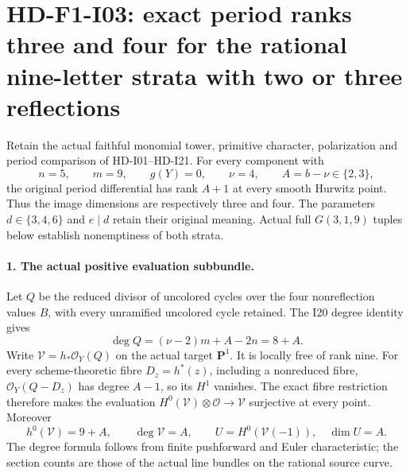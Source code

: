 \section[HD-F1-I03: nine letters and two or three reflections]{HD-F1-I03: exact period ranks three and four for the rational nine-letter strata with two or three reflections}
\label{sec:f1-nine-letter-two-three-reflection-rank}

Retain the actual faithful monomial tower, primitive character,
polarization and period comparison of HD-I01--HD-I21.
For every component with
\[
 n=5,\qquad m=9,\qquad g(Y)=0,\qquad \nu=4,
 \qquad A=b-\nu\in\{2,3\},
\]
the original period differential has rank $A+1$ at every smooth
Hurwitz point. Thus the image dimensions are respectively three
and four. The parameters $d\in\{3,4,6\}$ and $e\mid d$ retain
their original meaning. Actual full $G(3,1,9)$ tuples below
establish nonemptiness of both strata.

\paragraph{1. The actual positive evaluation subbundle.}
Let $Q$ be the reduced divisor of uncolored cycles over the
four nonreflection values $B$, with every unramified uncolored
cycle retained. The I20 degree identity gives
\[
 \deg Q=(\nu-2)m+A-2n=8+A.
\]
Write $\mathcal V=h_*\mathcal O_Y(Q)$ on the actual target
$\mathbf P^1$. It is locally free of rank nine. For every
scheme-theoretic fibre $D_z=h^*(z)$, including a nonreduced
fibre, $\mathcal O_Y(Q-D_z)$ has degree $A-1$, so its
$H^1$ vanishes. The exact fibre restriction therefore makes
the evaluation $H^0(\mathcal V)\otimes\mathcal O\to\mathcal V$
surjective at every point. Moreover
\[
 h^0(\mathcal V)=9+A,\qquad \deg\mathcal V=A,\qquad
 U=H^0(\mathcal V(-1)),\quad \dim U=A.
\]
The degree formula follows from finite pushforward and Euler
characteristic; the section counts are those of the actual
line bundles on the rational source curve.


